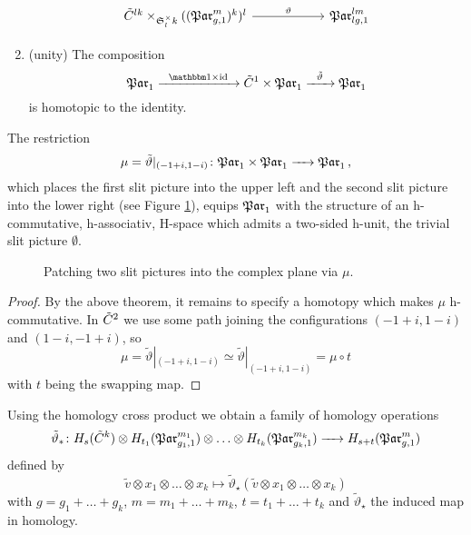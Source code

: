 \begin{thm}
\begin{enumerate}
\[\begin{tikzcd}[column sep=2cm]
                    \cspc{lk} \times_{\Symgrp^\times_lk} ((\Par_{g,1}^m)^k)^l                                         \arrow{r}{\vartheta}                                              & \Par_{lg,1}^{lm}
                \end{tikzcd}
            \]
        \item (unity) 
            The composition 
            \[
                \Par_1 \xr{\Eins \times \id} \cspc 1 \times \Par_1 \xr{\tilde\vartheta} \Par_1
            \]
            is homotopic to the identity.
    \end{enumerate}
\end{thm}

\begin{defcor}
    \label{homology_operations:parallel_patching_slit_pics:mu}
    The restriction
    \[
        \mu = \tilde\vartheta|_{(-1 + i, 1 - i)} \colon \mathfrak{Par}_1 \times \mathfrak{Par}_1 \xrightarrow{\hspace{6pt}{}\hspace{6pt}} \mathfrak{Par}_1 \,,
    \]
    which places the first slit picture into the upper left and the second slit picture into the lower right (see Figure \ref{homology_operations:parallel_patching_slit_pics:tilde_v_0_applied}),
    equips $\mathfrak{Par}_1$ with the structure of an h-commutative, h-associativ, H-space which admits a two-sided h-unit, the trivial slit picture $ \emptyset$.
\end{defcor}
\begin{figure}[ht]
    \centering
    \def\svgwidth{.2\columnwidth}
    
    \caption{\label{homology_operations:parallel_patching_slit_pics:tilde_v_0_applied}Patching two slit pictures into the complex plane via $\mu$.}
\end{figure}
\begin{proof}
    By the above theorem, it remains to specify a homotopy which makes $\mu$ h-com\-mu\-ta\-tive.
    In ${\tilde C^{2}}$ we use some path joining the configurations $( -1 + i, 1 - i)$ and $( 1 - i, -1 + i)$, so
    \[
        \mu = \tilde\vartheta|_{(-1 + i, 1 - i)} \simeq \tilde\vartheta|_{(-1 + i, 1 - i)} = \mu \circ t
    \]
    with $t$ being the swapping map.
\end{proof}

\begin{defi}
    \label{homology_operations:tilde_theta}
    Using the homology cross product we obtain a family of homology operations
    \[
        \tilde\vartheta_\ast \colon H_s(\cspc k) \otimes H_{t_1}( \Par_{g_1,1}^{m_1} ) \otimes \ldots \otimes H_{t_k}(\Par_{g_k,1}^{m_k}) \to H_{s+t}(\Par_{g,1}^m)
    \]
    defined by
    \[
        \tilde v \otimes x_1 \otimes \ldots \otimes x_k \mapsto \tilde\vartheta_{\star}( \tilde v \otimes x_1 \otimes \ldots \otimes x_k)
    \]
    with $g = g_1 + \ldots + g_k$, $m = m_1 + \ldots + m_k$, $t = t_1 + \ldots + t_k$ and $\tilde\vartheta_{\star}$ the induced map in homology.
\end{defi}

